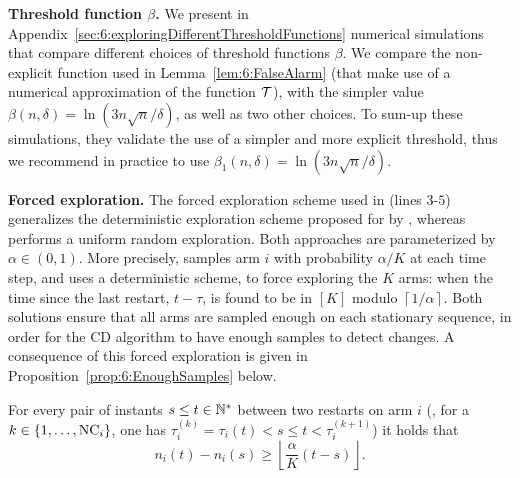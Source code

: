 \textbf{Threshold function $\beta$.}
%
We present in Appendix~\ref{sec:6:exploringDifferentThresholdFunctions} numerical simulations that compare different choices of threshold functions $\beta$.
We compare the non-explicit function used in Lemma~\ref{lem:6:FalseAlarm} (that make use of a numerical approximation of the function $\mathcal{T}$),
with the simpler value $\beta(n,\delta) = \ln(3n\sqrt{n}/\delta)$, as well as two other choices.
To sum-up these simulations, they validate the use of a simpler and more explicit threshold, thus we recommend in practice to use $\beta_1(n,\delta) = \ln(3n\sqrt{n}/\delta)$.



\textbf{Forced exploration.}
%
The forced exploration scheme used in \GLRklUCB{} (lines $3$-$5$) generalizes the deterministic exploration scheme proposed for \MUCB{} by \cite{CaoZhenKvetonXie18}, whereas \CUSUMUCB{} performs a uniform random exploration.
Both approaches are parameterized by $\alpha\in(0,1)$.
More precisely, \CUSUMUCB{} samples arm $i$ with probability $\alpha/K$ at each time step,
and \MUCB{} uses a deterministic scheme, to force exploring the $K$ arms: when the time since the last restart, $t - \tau$, is found to be in $[K]$ modulo $\left\lceil 1/\alpha \right\rceil$.
Both solutions ensure that all arms are sampled enough on each stationary sequence, in order for the CD algorithm to have enough \iid{} samples to detect changes.
%
A consequence of this forced exploration is given in Proposition~\ref{prop:6:EnoughSamples} below.

\begin{proposition}\label{prop:6:EnoughSamples}
\begin{leftbar}[propositionbar]  %
    For every pair of instants $s \leq t\in\mathbb{N}^*$ between two restarts on arm $i$ (\ie, for a $k\in\{1,\dots,\text{NC}_i\}$, one has $\tau_i^{(k)} = \tau_i(t) < s \leq t < \tau_i^{(k+1)}$) it holds that
    \begin{equation}
        n_i(t) - n_i(s) \geq \left\lfloor \frac{\alpha}{K} (t-s) \right\rfloor.
    \end{equation}
\end{leftbar}  %
\end{proposition}

